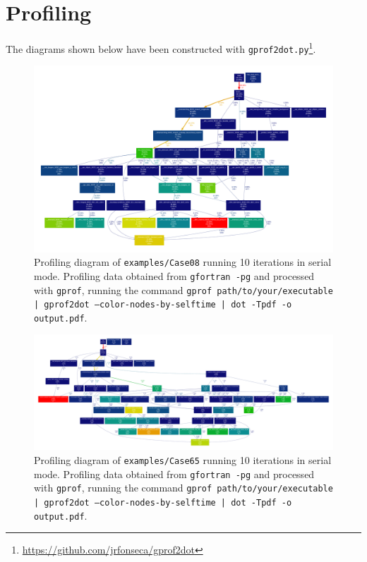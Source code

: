 \chapter{Profiling}\label{sec:profiling}

The diagrams shown below have been constructed with \texttt{gprof2dot.py}\footnote{\url{https://github.com/jrfonseca/gprof2dot}}.

\begin{figure}[!h]
  \centering
  \includegraphics[clip,width=\textwidth]{fig-profiling08.pdf}
  \caption{Profiling diagram of \texttt{examples/Case08} running 10 iterations in serial mode. Profiling data obtained from \texttt{gfortran -pg} and processed with \texttt{gprof}, running the command \texttt{gprof path/to/your/executable | gprof2dot --color-nodes-by-selftime | dot -Tpdf -o output.pdf}.}
\end{figure}

\newpage

\begin{figure}[!h]
  \centering
  \includegraphics[clip,width=0.9\textheight,angle=90]{fig-profiling65.pdf}
  \caption{Profiling diagram of \texttt{examples/Case65} running 10 iterations in serial mode. Profiling data obtained from \texttt{gfortran -pg} and processed with \texttt{gprof}, running the command \texttt{gprof path/to/your/executable | gprof2dot --color-nodes-by-selftime | dot -Tpdf -o output.pdf}.}
\end{figure}

